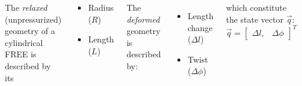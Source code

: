 \documentclass[25pt, a0paper, portrait]{tikzposter}
\newcommand{\mtx}[1]{\begin{bmatrix} #1 \end{bmatrix}}
\begin{document}
\begin{columns}
{{    %
    \begin{minipage}[c]{0.45\linewidth}
        The \emph{relaxed} (unpressurized) geometry of a cylindrical FREE is described by its
        \begin{multicols}{2}
        \begin{itemize}
            \setlength{\itemindent}{0.5in}
            \item Radius ($R$)
            \item Length ($L$)
        \end{itemize}
        \end{multicols}
        The \emph{deformed} geometry is described by:
        \begin{itemize}
            \setlength{\itemindent}{0.5in}
            \item Length change ($\Delta l$)
            \item Twist ($\Delta \phi$)
        \end{itemize}
        which constitute the state vector $\vec{q}$:
        \begin{equation*}
            \vec{q} = \mtx{\Delta l, & \Delta \phi}^T
        \end{equation*}
    \end{minipage}
    \hspace{25pt}
    \begin{minipage}[c]{0.5\linewidth}
        \centering
        \begin{tikzfigure}
            \includegraphics[width=\linewidth]{images/FREEstate_noLabels3.pdf}
        \end{tikzfigure}
    \end{minipage}
    
}}
\end{columns}
\end{document}
